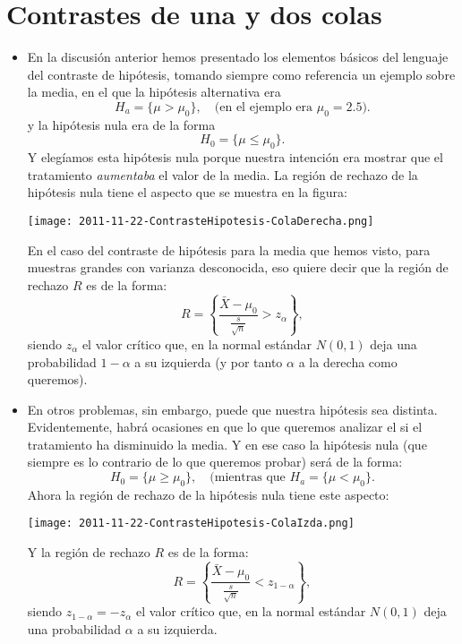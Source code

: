     \section{Contrastes de una y dos colas}

    \begin{itemize}

    \item En la discusión anterior hemos presentado los elementos básicos del lenguaje del contraste de hipótesis, tomando siempre como referencia un ejemplo sobre la media, en el que la hipótesis alternativa era
        \[H_a=\{\mu>\mu_0\},\quad \mbox{(en el ejemplo era }\mu_0=2.5).\]
        y la hipótesis nula era de la forma
        \[H_0=\{\mu\leq \mu_0\}.\]
        Y elegíamos esta hipótesis nula porque nuestra intención era mostrar que el tratamiento {\em aumentaba} el valor de la media. La región de rechazo de la hipótesis nula tiene el aspecto que se muestra en la figura:
        \begin{center}
        \texttt{[image: 2011-11-22-ContrasteHipotesis-ColaDerecha.png]}
        \end{center}
        En el caso del contraste de hipótesis para la media que hemos visto, para muestras grandes con varianza desconocida, eso quiere decir que la región de rechazo $R$ es de la forma:
        \[R=\left\{\dfrac{\bar X-\mu_0}{\frac{s}{\sqrt{n}}}>z_{\alpha}\right\},\]
        siendo $z_{\alpha}$ el valor crítico que, en la normal estándar  $N(0,1)$ deja una probabilidad $1-\alpha$ a su izquierda (y por tanto $\alpha$ a la derecha como queremos).


    \item En otros problemas, sin embargo, puede que nuestra hipótesis sea distinta. Evidentemente, habrá ocasiones en que lo que queremos analizar el si el tratamiento ha disminuido la media. Y en ese caso la hipótesis nula (que siempre es lo contrario de lo que queremos probar) será de la forma:
        \[H_0=\{\mu\geq \mu_0\},\quad \mbox{(mientras que  } H_a=\{\mu<\mu_0\}.\]
        Ahora la región de rechazo de la hipótesis nula tiene este aspecto:
        \begin{center}
        \texttt{[image: 2011-11-22-ContrasteHipotesis-ColaIzda.png]}
        \end{center}
        Y la región de rechazo $R$ es de la forma:
        \[R=\left\{\dfrac{\bar X-\mu_0}{\frac{s}{\sqrt{n}}}<z_{1-\alpha}\right\},\]
        siendo $z_{1-\alpha}=-z_{\alpha}$ el valor crítico que, en la normal estándar  $N(0,1)$ deja una probabilidad $\alpha$ a su izquierda.


\end{itemize}
